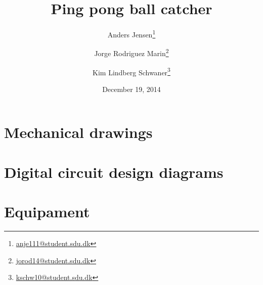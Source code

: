 \documentclass[]{report}
\title{Ping pong ball catcher}
\date{December 19, 2014}
\author{Anders Jensen\thanks{\url{anje111@student.sdu.dk}}}
\author{Jorge Rodriguez Marin\thanks{\url{jorod14@student.sdu.dk}}}
\author{Kim Lindberg Schwaner\thanks{\url{kschw10@student.sdu.dk}}}
\affil{University of Southern Denmark\\Faculty of Engineering\\EMB1}
\begin{document}
	\maketitle
	
	\tableofcontents
	
	
	
	
	
	
	
	
	

	\nocite{*} %
	\printbibliography[heading=bibintoc]

	\appendix
		\chapter{Mechanical drawings}
		\label{chap:mechanical_drawings}
			

		\chapter{Digital circuit design diagrams}
		\label{chap:digi_diagrams}
			
			

		\chapter{Equipament}
		\label{chap:equipment}
			
\end{document}

